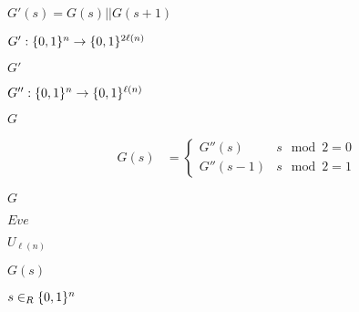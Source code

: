 \documentclass[10pt]{book}
\begin{document}
\begin{mdSnippets}
\begin{mdInlineSnippet}%
$G'(s) = G(s) || G(s+1)$\end{mdInlineSnippet}%
\begin{mdInlineSnippet}%
$G': \{0,1\}^{n} \to \{0,1\}^{2\ell(n)}$\end{mdInlineSnippet}%
\begin{mdInlineSnippet}[b1c5660b1392ecb094b31a0e42253ff9]%
$G'$\end{mdInlineSnippet}%
\begin{mdInlineSnippet}%
$G'': \{0,1\}^n \to \{0,1\}^{\ell(n)}$\end{mdInlineSnippet}%
\begin{mdInlineSnippet}[dfcf28d0734569a6a693bc8194de62bf]%
$G$\end{mdInlineSnippet}%
\begin{mdDisplaySnippet}[56956cf77a47de89c2807f707536582b]%
\[%
\begin{aligned}
G(s) &= \begin{cases}
 G''(s) &  s \mod 2 = 0\\
 G''(s-1) & s \mod 2 = 1
\end{cases}
\end{aligned} 
\]%
\end{mdDisplaySnippet}%
\begin{mdInlineSnippet}[dfcf28d0734569a6a693bc8194de62bf]%
$G$\end{mdInlineSnippet}%
\begin{mdInlineSnippet}%
$Eve$\end{mdInlineSnippet}%
\begin{mdInlineSnippet}[c77c7d0bbe417432357a68cc2d877048]%
$U_{\ell(n)}$\end{mdInlineSnippet}%
\begin{mdInlineSnippet}%
$G(s)$\end{mdInlineSnippet}%
\begin{mdInlineSnippet}%
$s \in_R \{0,1\}^n$\end{mdInlineSnippet}%
\begin{mdInlineSnippet}[0c3570ae86ed9d695d5d1d469a0b8bfa]%

\end{mdInlineSnippet}
\end{mdSnippets}
\end{document}
